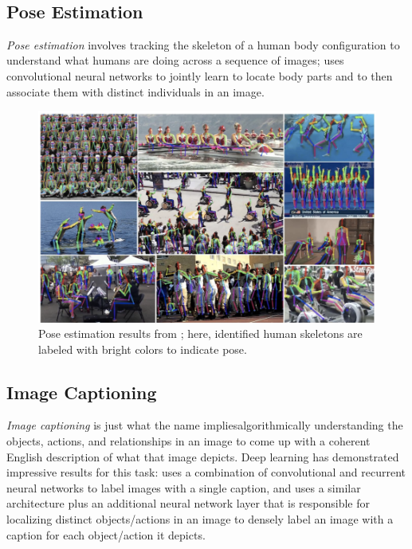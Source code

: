 ﻿\documentclass{article}
\begin{document}
\

\subsection{Pose Estimation}

\textit{Pose estimation} involves tracking the skeleton of a human body configuration to understand what humans are doing across a sequence of images; \cite{poseest} uses convolutional neural networks to jointly learn to locate body parts and to then associate them with distinct individuals in an image.

\begin{figure}[h]
\includegraphics[width=12cm]{poseest.png}
\centering
\caption{Pose estimation results from \cite{poseest}; here, identified human skeletons are labeled with bright colors to indicate pose.}
\end{figure}

\subsection{Image Captioning}

\textit{Image captioning} is just what the name implies\textemdash algorithmically understanding the objects, actions, and relationships in an image to come up with a coherent English description of what that image depicts. Deep learning has demonstrated impressive results for this task: \cite{singlecap} uses a combination of convolutional and recurrent neural networks to label images with a single caption, and \cite{densecap} uses a similar architecture plus an additional neural network layer that is responsible for localizing distinct objects/actions in an image to densely label an image with a caption for each object/action it depicts.
\end{document}
